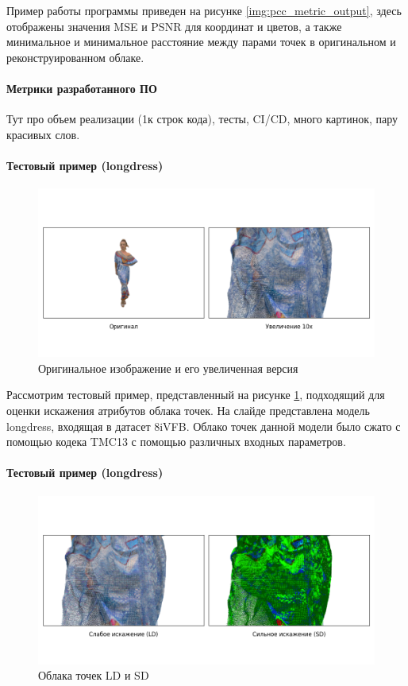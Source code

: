 \documentclass[a4paper,12pt]{extreport}
\begin{document}
Пример работы программы приведен на рисунке \ref{img:pcc_metric_output}, здесь
отображены значения MSE и PSNR для координат и цветов, а также минимальное и
минимальное расстояние между парами точек в оригинальном и реконструированном
облаке.

\paragraph{Метрики разработанного ПО}

Тут про объем реализации (1к строк кода), тесты, CI/CD, много картинок, пару
красивых слов.

\paragraph{Тестовый пример (longdress)}

\begin{figure}[H]
    \centering
    \includegraphics[width=0.7\linewidth]{assets/orig_plot.png}
    \caption{Оригинальное изображение и его увеличенная версия}
    \label{img:longdress_orig}
\end{figure}

Рассмотрим тестовый пример, представленный на рисунке \ref{img:longdress_orig},
подходящий для оценки искажения атрибутов облака точек. На слайде представлена
модель longdress, входящая в датасет 8iVFB. Облако точек данной модели было
сжато с помощью кодека TMC13 с помощью различных входных параметров.

\paragraph{Тестовый пример (longdress)}

\begin{figure}[H]
    \centering
    \includegraphics[width=0.7\linewidth]{assets/distorted_plot.png}
    \caption{Облака точек LD и SD}
    \label{img:longdress_dist}
\end{figure}
\end{document}
